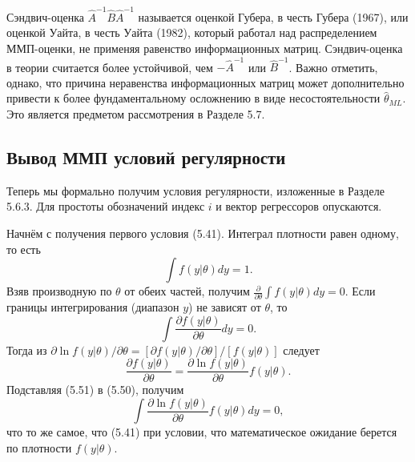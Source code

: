 Сэндвич-оценка $\hat{A}^{-1}\hat{B}\hat{A}^{-1}$ называется оценкой Губера, в честь Губера (1967), или оценкой Уайта, в честь Уайта (1982), который работал над распределением ММП-оценки, не применяя равенство информационных матриц. Сэндвич-оценка в теории считается
более устойчивой, чем $-\hat{A}^{-1}$ или $\hat{B}^{-1}$. Важно отметить, однако, что причина неравенства информационных матриц может дополнительно привести к более фундаментальному осложнению в виде несостоятельности $\hat{\theta}_{ML}$. Это является предметом рассмотрения в Разделе 5.7.

\subsection{Вывод ММП условий регулярности}

Теперь мы формально получим  условия регулярности, изложенные в Разделе 5.6.3. Для простоты обозначений индекс $i$ и вектор регрессоров опускаются.

Начнём с получения первого условия (5.41). Интеграл плотности равен одному, то есть
\[
\int f(y|\theta)dy=1.
\]
Взяв производную по $\theta$ от обеих частей, получим $\frac{\partial}{\partial \theta} \int f(y|\theta)dy=0$. Если границы интегрирования (диапазон $y$) не зависят от $\theta$, то
\begin{equation}
\int \frac{\partial f(y|\theta)}{\partial \theta}dy=0.
\end{equation} 
Тогда из  $\partial \ln f(y|\theta)/\partial \theta= [\partial f(y|\theta) / \partial \theta]/ [f(y|\theta)]$ следует
\begin{equation}
\frac{\partial f(y|\theta)}{\partial \theta}=\frac{\partial \ln f(y|\theta)}{\partial \theta}f(y|\theta).
\end{equation} 
Подставляя (5.51) в (5.50), получим
\begin{equation}
\int \frac{\partial \ln f(y|\theta)}{\partial \theta}f(y|\theta)dy=0,
\end{equation} 
что то же самое, что (5.41) при условии, что математическое ожидание берется по плотности $f(y|\theta)$.

